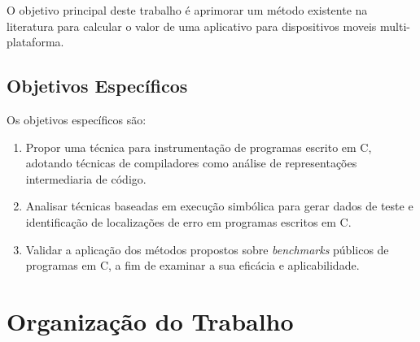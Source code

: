 
O objetivo principal deste trabalho é aprimorar um método existente na literatura para calcular o valor de uma aplicativo para dispositivos moveis multi-plataforma.

\subsection{Objetivos Específicos}



Os objetivos específicos são:
\begin{enumerate}
    \item Propor uma técnica para instrumentação de programas escrito em C, adotando técnicas de compiladores como análise de representações intermediaria de código.
    \item Analisar técnicas baseadas em execução simbólica para gerar dados de teste e identificação de localizações de erro em programas escritos em C.
    \item Validar a aplicação dos métodos propostos sobre \textit{benchmarks} públicos de programas em C, a fim de examinar a sua eficácia e aplicabilidade.
\end{enumerate}
		
\section{Organização do Trabalho}



